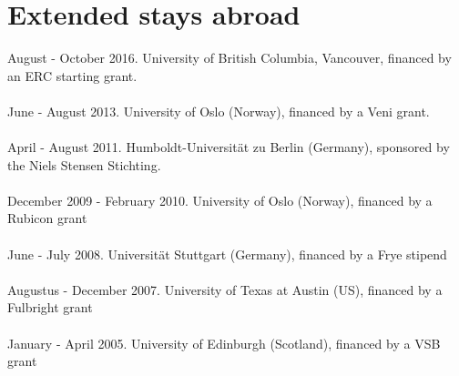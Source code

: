 \documentclass[a4paper,11pt]{article}
\begin{document}


\section*{Extended stays abroad}

August - October 2016. University of British Columbia, Vancouver, financed by an ERC starting grant.\\\\
June - August 2013. University of Oslo (Norway), financed by a Veni grant.\\\\
April - August 2011.  Humboldt-Universit\"at zu Berlin (Germany), sponsored by the Niels Stensen Stichting.\\\\
December 2009 - February 2010. University of Oslo (Norway), financed by a Rubicon grant\\\\
June - July 2008.  Universit\"at Stuttgart (Germany), financed by a Frye stipend\\\\
Augustus - December 2007. University of Texas at Austin (US), financed by a Fulbright grant\\\\
January - April 2005. University of Edinburgh (Scotland), financed by a VSB grant\\


\pagebreak
\end{document}
